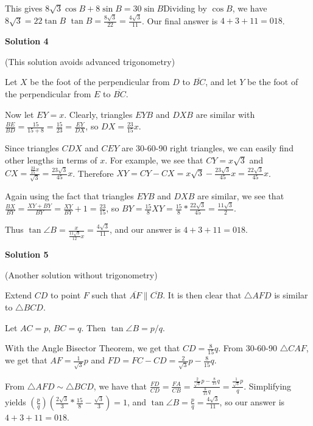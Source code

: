 \begin{enumerate}
 This gives $8\sqrt{3}\cos B+8\sin B=30\sin B$Dividing by $\cos B$, we have ${8\sqrt{3}}= 22\tan B$
$\tan{B} = \frac{8\sqrt{3}}{22} = \frac{4\sqrt{3}}{11}$. Our final answer is $4 + 3 + 11 = \boxed{018}$.

 



\textbf{Solution 4}

(This solution avoids advanced trigonometry)

 Let $X$ be the foot of the perpendicular from $D$ to $\overline{BC}$, and let $Y$ be the foot of the perpendicular from $E$ to $\overline{BC}$.

 Now let $EY=x$. Clearly, triangles $EYB$ and $DXB$ are similar with $\frac{BE}{BD}=\frac{15}{15+8}=\frac{15}{23}=\frac{EY}{DX}$, so $DX=\frac{23}{15}x$.

 Since triangles $CDX$ and $CEY$ are 30-60-90 right triangles, we can easily find other lengths in terms of $x$. For example, we see that $CY=x\sqrt{3}$ and $CX=\frac{\frac{23}{15}x}{\sqrt{3}}=\frac{23\sqrt{3}}{45}x$. Therefore $XY=CY-CX=x\sqrt{3}-\frac{23\sqrt{3}}{45}x=\frac{22\sqrt{3}}{45}x$.

 Again using the fact that triangles $EYB$ and $DXB$ are similar, we see that $\frac{BX}{BY}=\frac{XY+BY}{BY}=\frac{XY}{BY}+1=\frac{23}{15}$, so $BY=\frac{15}{8}XY=\frac{15}{8}*\frac{22\sqrt{3}}{45}=\frac{11\sqrt{3}}{2}$.

 Thus $\tan \angle B = \frac{x}{\frac{11\sqrt{3}}{12}x}=\frac{4\sqrt{3}}{11}$, and our answer is $4+3+11=\boxed{018}$.

 



\textbf{Solution 5}

(Another solution without trigonometry)

 Extend $CD$ to point $F$ such that $\overline{AF} \parallel \overline{CB}$. It is then clear that $\triangle AFD$ is similar to $\triangle BCD$.

 Let $AC=p$, $BC=q$. Then $\tan \angle B = p/q$.

 With the Angle Bisector Theorem, we get that $CD=\frac{8}{15}q$. From 30-60-90 $\triangle CAF$, we get that $AF=\frac{1}{\sqrt{3}}p$ and $FD=FC-CD=\frac{2}{\sqrt{3}}p-\frac{8}{15}q$.

 From $\triangle AFD \sim \triangle BCD$, we have that $\frac{FD}{CD}=\frac{FA}{CB}=\frac{\frac{2}{\sqrt{3}}p-\frac{8}{15}q}{\frac{8}{15}q}=\frac{\frac{1}{\sqrt{3}}p}{q}$. Simplifying yields $\left(\frac{p}{q}\right)\left(\frac{2\sqrt{3}}{3}*\frac{15}{8}-\frac{\sqrt{3}}{3}\right)=1$, and $\tan \angle B=\frac{p}{q}=\frac{4\sqrt{3}}{11}$, so our answer is $4+3+11=\boxed{018}$.


\end{enumerate}
